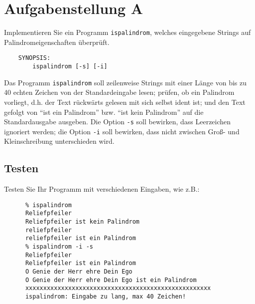 




\section*{Aufgabenstellung A}

Implementieren Sie ein Programm {\tt ispalindrom}, welches
eingegebene Strings auf Palindromeigenschaften überprüft.

\begin{verbatim}
    SYNOPSIS:
        ispalindrom [-s] [-i]
\end{verbatim}

Das Programm {\tt ispalindrom} soll zeilenweise Strings mit einer
Länge von bis zu 40 echten Zeichen von der Standardeingabe lesen;
prüfen, ob ein Palindrom vorliegt, d.h. der Text rückwärts gelesen
mit sich selbst ident ist; und den Text gefolgt von "`ist ein
Palindrom"' bzw. "`ist kein Palindrom"' auf die Standardausgabe
ausgeben. Die Option {\tt -s} soll bewirken, dass Leerzeichen
ignoriert werden; die Option {\tt -i} soll bewirken, dass nicht
zwischen Groß- und Kleinschreibung unterschieden wird.

\subsection*{Testen}

Testen Sie Ihr Programm mit verschiedenen Eingaben, wie z.B.:

\begin{verbatim}
      % ispalindrom
      Reliefpfeiler
      Reliefpfeiler ist kein Palindrom
      reliefpfeiler
      reliefpfeiler ist ein Palindrom
      % ispalindrom -i -s
      Reliefpfeiler
      Reliefpfeiler ist ein Palindrom
      O Genie der Herr ehre Dein Ego
      O Genie der Herr ehre Dein Ego ist ein Palindrom
      xxxxxxxxxxxxxxxxxxxxxxxxxxxxxxxxxxxxxxxxxxxxxxxxxxxx
      ispalindrom: Eingabe zu lang, max 40 Zeichen!
\end{verbatim}

\osueguidelinesone


